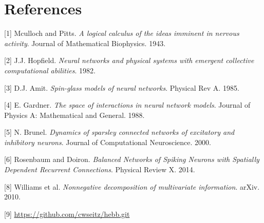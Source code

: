 \documentclass{article} %
\begin{document}
\section*{References}

[1] Mculloch and Pitts. \textit{A logical calculus of the ideas imminent in nervous activity}. Journal of Mathematical Biophysics. 1943.

[2] J.J. Hopfield. \textit{Neural networks and physical systems with emergent collective computational abilities}. 1982.

[3] D.J. Amit. \textit{Spin-glass models of neural networks}. Physical Rev A. 1985.

[4] E. Gardner. \textit{The space of interactions in neural network models}. Journal of Physics A: Mathematical and General. 1988.

[5] N. Brunel. \textit{Dynamics of sparsley connected networks of excitatory and inhibitory neurons}. Journal of Computational Neuroscience. 2000. 

[6] Rosenbaum and Doiron. \textit{Balanced Networks of Spiking Neurons with Spatially Dependent Recurrent Connections}. Physical Review X. 2014.

[8] Williams et al. \textit{Nonnegative decomposition of multivariate information}. arXiv. 2010.

[9] \url{https://github.com/cwseitz/hebb.git}
\end{document}
